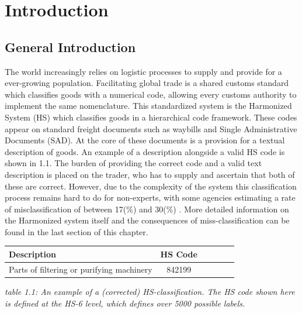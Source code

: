 \UseRawInputEncoding
\chapter{Introduction}\label{ch:intro}
\section{General Introduction}
The world increasingly relies on logistic processes to supply and provide for
a ever-growing population. Facilitating global trade is a shared customs
standard which classifies goods with a numerical code, allowing every customs
authority to implement the same nomenclature. This standardized
system is the Harmonized System (HS) which classifies goods in a hierarchical
code framework. These codes appear on standard freight documents
such as waybills and Single Administrative Documents (SAD). At the core
of these documents is a provision for a textual description of goods. An
example of a description alongside a valid HS code is shown in 1.1. The
burden of providing the correct code and a valid text description is placed
on the trader, who has to supply and ascertain that both of these are correct.
However, due to the complexity of the system this classification process
remains hard to do for non-experts, with some agencies estimating a rate of
misclassification of between 17(\%) and 30(\%) \cite{OfficeoftheAuditorGeneralofCanadaGovernmentofCanada.2010}. More detailed information
on the Harmonized system itself and the consequences of miss-classification
can be found in the last section of this chapter. \\

\begin{center}
    \begin{tabular}{lccccc} \hline \centering
Description & HS Code \\ \hline
Parts of filtering or purifying machinery & 842199 \\ \hline
	\end{tabular}
\end{center}
{\textit{table 1.1: An example of a (corrected) HS-classification. The HS code shown here is defined at the HS-6 level, which defines over 5000 possible labels.}} \\

